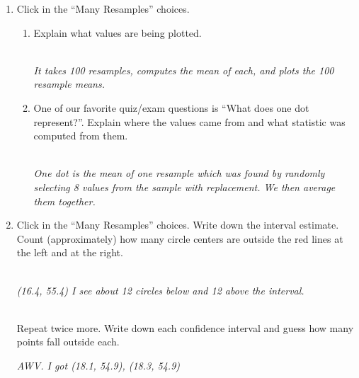 \begin{enumerate}
\begin{enumerate}
\item  Click   in the ``Many Resamples'' choices.
  \begin{enumerate}
  \item  Explain  what values are being plotted.  
\begin{students}
        \vspace{2cm}        
\end{students}
\begin{key}
  \\{\it It takes  100 resamples, computes the mean of
    each, and plots the 100 resample means. }
\end{key}
  \item One of our favorite quiz/exam questions is ``What does one dot
    represent?''. Explain where the values came from and what
    statistic was computed from them. 
\begin{students}
        \vspace{3cm}        
\end{students}
\begin{key}
  \\{\it One dot is the mean of one resample which was found by
    randomly selecting 8  values from the sample with replacement. We
    then average them     together.}
\end{key}
\end{enumerate}

\item  Click   in the ``Many Resamples'' choices.
 Write down the interval estimate.  Count
      (approximately) how many circle centers are outside the red
      lines at the left and at the right.
\begin{students}
        \vspace{1cm}        
\end{students}
\begin{key}
  \\{\it (16.4, 55.4)  I see about 12 circles below and  12 above the interval.}
\end{key}
\\
  Repeat twice more. Write down each confidence interval and guess how
  many points fall outside each.
\begin{students}
        \vspace{1cm}        
\end{students}
\begin{key}
{\it AWV. I got (18.1, 54.9), (18.3, 54.9)}
\end{key}


\end{enumerate}
\end{enumerate}
